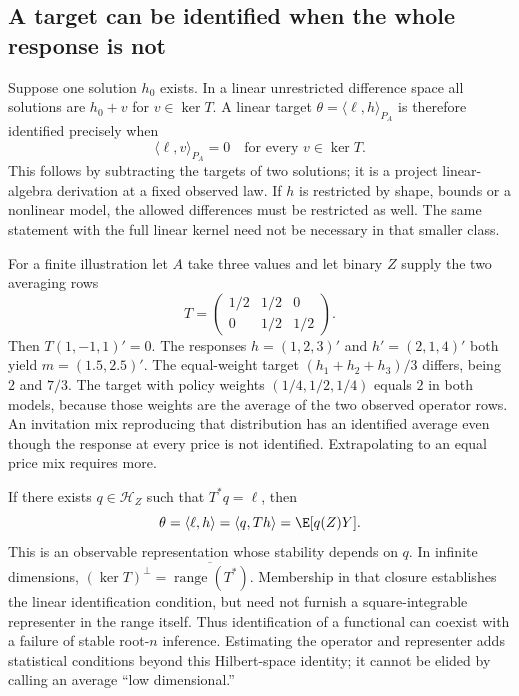\subsection{A target can be identified when the whole response is not}
\label{r3:inverse-functional}
Suppose one solution $h_0$ exists. In a linear unrestricted difference
space all solutions are $h_0+v$ for $v\in\ker T$. A linear target
$\theta=\langle\ell,h\rangle_{P_A}$ is therefore identified precisely
when
\begin{equation}
 \langle\ell,v\rangle_{P_A}=0\quad\text{for every }v\in\ker T.
 \label{r3:null-functional}
\end{equation}
This follows by subtracting the targets of two solutions; it is a
project linear-algebra derivation at a fixed observed law. If $h$ is
restricted by shape, bounds or a nonlinear model, the allowed differences
must be restricted as well. The same statement with the full linear
kernel need not be necessary in that smaller class.

For a finite illustration let $A$ take three values and let binary $Z$
supply the two averaging rows
\[
 T=\begin{pmatrix}1/2&1/2&0\\0&1/2&1/2\end{pmatrix}.
\]
Then $T(1,-1,1)'=0$. The responses
$h=(1,2,3)'$ and $h'=(2,1,4)'$ both yield $m=(1.5,2.5)'$.
The equal-weight target $(h_1+h_2+h_3)/3$ differs, being $2$ and
$7/3$. The target with policy weights $(1/4,1/2,1/4)$ equals $2$
in both models, because those weights are the average of the two
observed operator rows. An invitation mix reproducing that distribution
has an identified average even though the response at every price is
not identified. Extrapolating to an equal price mix requires more.

If there exists $q\in\mathcal H_Z$ such that $T^*q=\ell$, then
\begin{equation}
 \theta=\langle\ell,h\rangle
       =\langle q,Th\rangle=\E[q(Z)Y].
 \label{r3:adjoint-target}
\end{equation}
This is an observable representation whose stability depends on $q$.
In infinite dimensions,
$(\ker T)^\perp=\overline{\operatorname{range}(T^*)}$.
Membership in that closure establishes the linear identification
condition, but need not furnish a square-integrable representer in the
range itself. Thus identification of a functional can coexist with a
failure of stable root-$n$ inference. Estimating the operator and
representer adds statistical conditions beyond this Hilbert-space
identity; it cannot be elided by calling an average ``low dimensional.''


